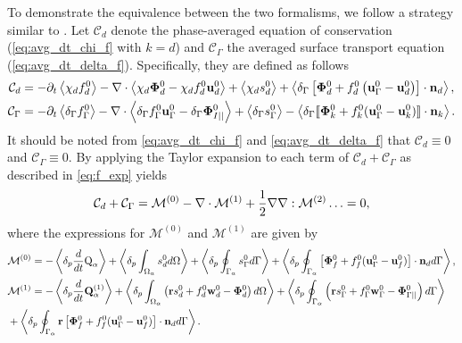 \documentclass[11pt]{My_preprint}
\begin{document}
To demonstrate the equivalence between the two formalisms, we follow a strategy similar to \citep{lhuillier2000bilan,lhuillier2009rheology}. 
Let $\mathcal{C}_d$ denote the phase-averaged equation of conservation (\ref{eq:avg_dt_chi_f} with $k=d$) and $\mathcal{C}_\Gamma $ the averaged surface transport equation (\ref{eq:avg_dt_delta_f}).
Specifically, they are defined as follows
\begin{align}
    \mathcal{C}_d
    &=
    - \partial_t \left<\chi_df_d^0\right>
    - \mathbf{\nabla}\cdot \left<\chi_d \mathbf{\Phi}_d^0 - \chi_df_d^0 \textbf{u}_d^0\right>
    + \left<\chi_d s_d^0\right>
    + \left<\delta_\Gamma \left[
        \mathbf{\Phi}_d^0
        + f_d^0
        \left(
            \textbf{u}_\Gamma ^0
            - \textbf{u}_d^0
        \right)
    \right]
    \cdot \textbf{n}_d\right>,\\
    \mathcal{C}_\Gamma 
    &= 
    -\partial_t \left<\delta_\Gamma f_\Gamma ^0\right>
    -\mathbf{\nabla}\cdot \left<\delta_\Gamma  f_\Gamma ^0 \textbf{u}_\Gamma ^0-\delta_\Gamma  \mathbf{\Phi}_{I||}^0 \right>
    + \left<\delta_\Gamma s_\Gamma ^0\right> 
    - \left<\delta_\Gamma  \llbracket 
     \mathbf{\Phi}_k^0+
    f_k^0 (\textbf{u}_\Gamma ^0 - \textbf{u}_k^0)
     \rrbracket \cdot \textbf{n}_k \right>. 
\end{align}
It should be noted from \ref{eq:avg_dt_chi_f} and \ref{eq:avg_dt_delta_f} that $\mathcal{C}_d\equiv 0$ and $\mathcal{C}_\Gamma  \equiv 0$.
By applying the Taylor expansion to each term of $\mathcal{C}_d+\mathcal{C}_\Gamma $ as described in \ref{eq:f_exp} yields
\begin{equation}
    \mathcal{C}_d 
    + \mathcal{C}_\Gamma  
    = \mathcal{M}^{(0)} - \div \mathcal{M}^{(1)} + \frac{1}{2} \grad\grad : \mathcal{M}^{(2)} \ldots = 0,
    \label{eq:scheme_equivalence}
\end{equation} 
where the expressions for $\mathcal{M}^{(0)}$ and $\mathcal{M}^{(1)}$ are given by 
\begin{align}
    &\mathcal{M}^{(0)}
    = 
    - \left<\delta_p \frac{d}{dt} {\text Q_\alpha}\right>
+ \left<\delta_p \int_{\Omega_{\alpha}}  s_d^0  d\Omega\right>
    + \left<\delta_p \oint_{\Gamma_{\alpha}}  s_\Gamma ^0  d\Gamma\right>
    + \left<\delta_p \oint_{\Gamma_{\alpha}}  
    \left[\mathbf{\Phi}_f^0 
    + f_f^0 (\textbf{u}_\Gamma ^0-\textbf{u}_f^0) \right] \cdot \textbf{n}_d  d\Gamma\right>,\\
    &\mathcal{M}^{(1)} =
    -  \left<\delta_p \frac{d}{dt} {\textbf{Q}_\alpha^{(1)}}\right>
+ \left<\delta_p \int_{\Omega_{\alpha}}  \left(
        \textbf{r} s_d^0         
        + f_d^0  \textbf{w}_d^0 
        - \mathbf{\Phi}_d^0
    \right)  d\Omega\right>
    + \left<\delta_p \oint_{\Gamma_{\alpha}}  \left(
        \textbf{r}s_\Gamma ^0
        + f_\Gamma ^0 \textbf{w}_\Gamma ^0
        - \mathbf{\Phi}_{\Gamma||}^0
    \right)  d\Gamma\right> \nonumber\\
    &+ \left<\delta_p \oint_{\Gamma_{\alpha}}  \textbf{r} \left[
        \mathbf{\Phi}_f^0
        + f_f^0 (\textbf{u}_\Gamma ^0-\textbf{u}_f^0)
    \right]\cdot \textbf{n}_d   d\Gamma\right>.
\end{align}
\end{document}
